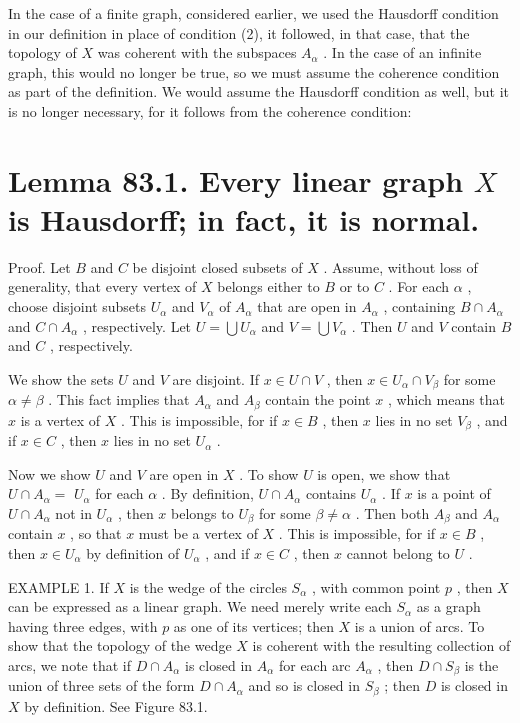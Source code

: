 In the case of a finite graph, considered earlier, we used the Hausdorff condition in our definition in place of condition (2), it followed, in that case, that the topology of \(X\) was coherent with the subspaces \({A}_{\alpha }\) . In the case of an infinite graph, this would no longer be true, so we must assume the coherence condition as part of the definition. We would assume the Hausdorff condition as well, but it is no longer necessary, for it follows from the coherence condition:

\section*{Lemma 83.1. Every linear graph \(X\) is Hausdorff; in fact, it is normal.}

Proof. Let \(B\) and \(C\) be disjoint closed subsets of \(X\) . Assume, without loss of generality, that every vertex of \(X\) belongs either to \(B\) or to \(C\) . For each \(\alpha\) , choose disjoint subsets \({U}_{\alpha }\) and \({V}_{\alpha }\) of \({A}_{\alpha }\) that are open in \({A}_{\alpha }\) , containing \(B \cap  {A}_{\alpha }\) and \(C \cap  {A}_{\alpha }\) , respectively. Let \(U = \bigcup {U}_{\alpha }\) and \(V = \bigcup {V}_{\alpha }\) . Then \(U\) and \(V\) contain \(B\) and \(C\) , respectively.

We show the sets \(U\) and \(V\) are disjoint. If \(x \in  U \cap  V\) , then \(x \in  {U}_{\alpha } \cap  {V}_{\beta }\) for some \(\alpha  \neq  \beta\) . This fact implies that \({A}_{\alpha }\) and \({A}_{\beta }\) contain the point \(x\) , which means that \(x\) is a vertex of \(X\) . This is impossible, for if \(x \in  B\) , then \(x\) lies in no set \({V}_{\beta }\) , and if \(x \in  C\) , then \(x\) lies in no set \({U}_{\alpha }\) .

Now we show \(U\) and \(V\) are open in \(X\) . To show \(U\) is open, we show that \(U \cap  {A}_{\alpha } =\)  \({U}_{\alpha }\) for each \(\alpha\) . By definition, \(U \cap  {A}_{\alpha }\) contains \({U}_{\alpha }\) . If \(x\) is a point of \(U \cap  {A}_{\alpha }\) not in \({U}_{\alpha }\) , then \(x\) belongs to \({U}_{\beta }\) for some \(\beta  \neq  \alpha\) . Then both \({A}_{\beta }\) and \({A}_{\alpha }\) contain \(x\) , so that \(x\) must be a vertex of \(X\) . This is impossible, for if \(x \in  B\) , then \(x \in  {U}_{\alpha }\) by definition of \({U}_{\alpha }\) , and if \(x \in  C\) , then \(x\) cannot belong to \(U\) .

EXAMPLE 1. If \(X\) is the wedge of the circles \({S}_{\alpha }\) , with common point \(p\) , then \(X\) can be expressed as a linear graph. We need merely write each \({S}_{\alpha }\) as a graph having three edges, with \(p\) as one of its vertices; then \(X\) is a union of arcs. To show that the topology of the wedge \(X\) is coherent with the resulting collection of arcs, we note that if \(D \cap  {A}_{\alpha }\) is closed in \({A}_{\alpha }\) for each arc \({A}_{\alpha }\) , then \(D \cap  {S}_{\beta }\) is the union of three sets of the form \(D \cap  {A}_{\alpha }\) and so is closed in \({S}_{\beta }\) ; then \(D\) is closed in \(X\) by definition. See Figure 83.1.

